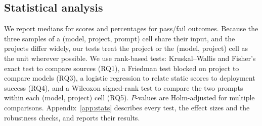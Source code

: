 \subsection{Statistical analysis}\label{sec:method-analysis}

We report medians for scores and percentages for pass/fail outcomes. Because the three samples of a (model, project, prompt) cell share their input, and the projects differ widely, our tests treat the project or the (model, project) cell as the unit wherever possible. We use rank-based tests: Kruskal--Wallis and Fisher's exact test to compare sources (RQ1), a Friedman test blocked on project to compare models (RQ3), a logistic regression to relate static scores to deployment success (RQ4), and a Wilcoxon signed-rank test to compare the two prompts within each (model, project) cell (RQ5). $P$-values are Holm-adjusted for multiple comparisons. Appendix~\ref{app:stats} describes every test, the effect sizes and the robustness checks, and reports their results.
